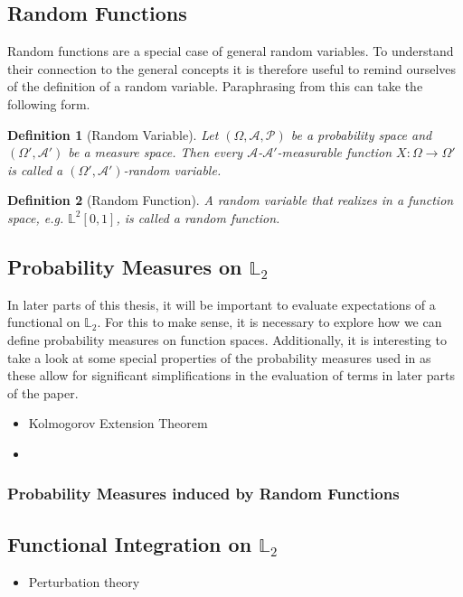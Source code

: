 \documentclass[12pt, a4paper]{article}
\theoremstyle{MAstyle} \newtheorem{assumption}{Assumption}[section]
\theoremstyle{MAstyle} \newtheorem{definition}{Definition}[section]
\begin{document}
		\subsection{Random Functions}
			Random functions are a special case of general random variables. To understand their connection to the general concepts it is therefore useful to remind ourselves of the definition of a random variable. Paraphrasing from \cite{bauer_probability_2011} this can take the following form.
			\begin{definition}[Random Variable]
				Let $\left(\Omega, \mathcal{A}, \mathcal{P}\right)$ be a probability space and $\left(\Omega', \mathcal{A}'\right)$ be a measure space. Then every $\mathcal{A}$-$\mathcal{A}'$-measurable function $X:\Omega \rightarrow \Omega'$ is called a $\left(\Omega', \mathcal{A}'\right)$-random variable.
			\end{definition}
		
			\begin{definition}[Random Function]
				A random variable that realizes in a function space, e.g. $\mathbb{L}^2[0,1]$, is called a random function.
			\end{definition}
		
		\subsection{Probability Measures on $\mathbb{L}_2$}\label{prob_measures_l2}
			In later parts of this thesis, it will be important to evaluate expectations of a functional on $\mathbb{L}_2$. For this to make sense, it is necessary to explore how we can define probability measures on function spaces. Additionally, it is interesting to take a look at some special properties of the probability measures used in \cite{bugni_permutation_2021} as these allow for significant simplifications in the evaluation of terms in later parts of the paper.
			\begin{itemize}
				\item Kolmogorov Extension Theorem
				\item \cite{gihman_theory_2004}
			\end{itemize}
		
			\subsubsection{Probability Measures induced by Random Functions}
		
		\subsection{Functional Integration on $\mathbb{L}_2$}
			\begin{itemize}
				\item Perturbation theory
			\end{itemize}
		
\end{document}
